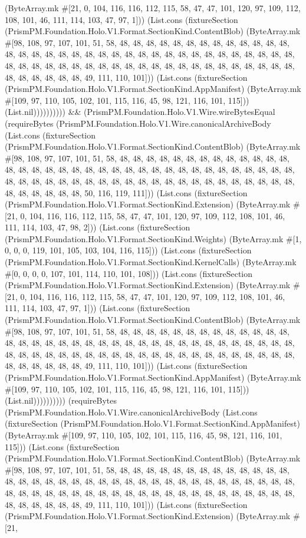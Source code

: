 \documentclass[11pt]{article}
\begin{document}
(ByteArray.mk \#[21, 0, 104, 116, 116, 112, 115, 58, 47, 47, 101, 120, 97, 109, 112, 108, 101, 46, 111, 114, 103, 47, 97, 1])) (List.cons (fixtureSection (PrismPM.Foundation.Holo.V1.Format.SectionKind.ContentBlob) (ByteArray.mk \#[98, 108, 97, 107, 101, 51, 58, 48, 48, 48, 48, 48, 48, 48, 48, 48, 48, 48, 48, 48, 48, 48, 48, 48, 48, 48, 48, 48, 48, 48, 48, 48, 48, 48, 48, 48, 48, 48, 48, 48, 48, 48, 48, 48, 48, 48, 48, 48, 48, 48, 48, 48, 48, 48, 48, 48, 48, 48, 48, 48, 48, 48, 48, 48, 48, 48, 48, 48, 48, 48, 49, 111, 110, 101])) (List.cons (fixtureSection (PrismPM.Foundation.Holo.V1.Format.SectionKind.AppManifest) (ByteArray.mk \#[109, 97, 110, 105, 102, 101, 115, 116, 45, 98, 121, 116, 101, 115])) (List.nil)))))))))) \&\& (PrismPM.Foundation.Holo.V1.Wire.wireBytesEqual (requireBytes (PrismPM.Foundation.Holo.V1.Wire.canonicalArchiveBody (List.cons (fixtureSection (PrismPM.Foundation.Holo.V1.Format.SectionKind.ContentBlob) (ByteArray.mk \#[98, 108, 97, 107, 101, 51, 58, 48, 48, 48, 48, 48, 48, 48, 48, 48, 48, 48, 48, 48, 48, 48, 48, 48, 48, 48, 48, 48, 48, 48, 48, 48, 48, 48, 48, 48, 48, 48, 48, 48, 48, 48, 48, 48, 48, 48, 48, 48, 48, 48, 48, 48, 48, 48, 48, 48, 48, 48, 48, 48, 48, 48, 48, 48, 48, 48, 48, 48, 48, 48, 50, 116, 119, 111])) (List.cons (fixtureSection (PrismPM.Foundation.Holo.V1.Format.SectionKind.Extension) (ByteArray.mk \#[21, 0, 104, 116, 116, 112, 115, 58, 47, 47, 101, 120, 97, 109, 112, 108, 101, 46, 111, 114, 103, 47, 98, 2])) (List.cons (fixtureSection (PrismPM.Foundation.Holo.V1.Format.SectionKind.Weights) (ByteArray.mk \#[1, 0, 0, 0, 119, 101, 105, 103, 104, 116, 115])) (List.cons (fixtureSection (PrismPM.Foundation.Holo.V1.Format.SectionKind.KernelCalls) (ByteArray.mk \#[0, 0, 0, 0, 107, 101, 114, 110, 101, 108])) (List.cons (fixtureSection (PrismPM.Foundation.Holo.V1.Format.SectionKind.Extension) (ByteArray.mk \#[21, 0, 104, 116, 116, 112, 115, 58, 47, 47, 101, 120, 97, 109, 112, 108, 101, 46, 111, 114, 103, 47, 97, 1])) (List.cons (fixtureSection (PrismPM.Foundation.Holo.V1.Format.SectionKind.ContentBlob) (ByteArray.mk \#[98, 108, 97, 107, 101, 51, 58, 48, 48, 48, 48, 48, 48, 48, 48, 48, 48, 48, 48, 48, 48, 48, 48, 48, 48, 48, 48, 48, 48, 48, 48, 48, 48, 48, 48, 48, 48, 48, 48, 48, 48, 48, 48, 48, 48, 48, 48, 48, 48, 48, 48, 48, 48, 48, 48, 48, 48, 48, 48, 48, 48, 48, 48, 48, 48, 48, 48, 48, 48, 48, 49, 111, 110, 101])) (List.cons (fixtureSection (PrismPM.Foundation.Holo.V1.Format.SectionKind.AppManifest) (ByteArray.mk \#[109, 97, 110, 105, 102, 101, 115, 116, 45, 98, 121, 116, 101, 115])) (List.nil)))))))))) (requireBytes (PrismPM.Foundation.Holo.V1.Wire.canonicalArchiveBody (List.cons (fixtureSection (PrismPM.Foundation.Holo.V1.Format.SectionKind.AppManifest) (ByteArray.mk \#[109, 97, 110, 105, 102, 101, 115, 116, 45, 98, 121, 116, 101, 115])) (List.cons (fixtureSection (PrismPM.Foundation.Holo.V1.Format.SectionKind.ContentBlob) (ByteArray.mk \#[98, 108, 97, 107, 101, 51, 58, 48, 48, 48, 48, 48, 48, 48, 48, 48, 48, 48, 48, 48, 48, 48, 48, 48, 48, 48, 48, 48, 48, 48, 48, 48, 48, 48, 48, 48, 48, 48, 48, 48, 48, 48, 48, 48, 48, 48, 48, 48, 48, 48, 48, 48, 48, 48, 48, 48, 48, 48, 48, 48, 48, 48, 48, 48, 48, 48, 48, 48, 48, 48, 49, 111, 110, 101])) (List.cons (fixtureSection (PrismPM.Foundation.Holo.V1.Format.SectionKind.Extension) (ByteArray.mk \#[21, 
\end{document}
